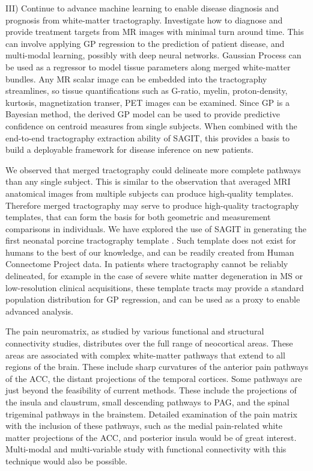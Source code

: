 III) Continue to advance machine learning to enable disease diagnosis and prognosis from white-matter tractography. Investigate how to diagnose and provide treatment targets from MR images with minimal turn around time. This can involve applying GP regression to the prediction of patient disease, and multi-modal learning, possibly with deep neural networks. Gaussian Process can be used as a regressor to model tissue parameters along merged white-matter bundles. Any MR scalar image can be embedded into the tractography streamlines, so tissue quantifications such as G-ratio, myelin, proton-density, kurtosis, magnetization transer, PET images can be examined. Since GP is a Bayesian method, the derived GP model can be used to provide predictive confidence on centroid measures from single subjects. When combined with the end-to-end tractography extraction ability of SAGIT, this provides a basis to build a deployable framework for disease inference on new patients. 


We observed that merged tractography could delineate more complete pathways than any single subject. This is similar to the observation that averaged MRI anatomical images from multiple subjects can produce high-quality templates. Therefore merged tractography may serve to produce high-quality tractography templates, that can form the basis for both geometric and measurement comparisons in individuals. We have explored the use of SAGIT in generating the first neonatal porcine tractography template \cite{Zhong2016a}. Such template does not exist for humans to the best of our knowledge, and can be readily created from Human Connectome Project data. In patients where tractography cannot be reliably delineated, for example in the case of severe white matter degeneration in MS or low-resolution clinical acquisitions, these template tracts may provide a standard population distribution for GP regression, and can be used as a proxy to enable advanced analysis.

The pain neuromatrix, as studied by various functional and structural connectivity studies, distributes over the full range of neocortical areas. These areas are associated with complex white-matter pathways that extend to all regions of the brain. These include sharp curvatures of the anterior pain pathways of the ACC, the distant projections of the temporal cortices. Some pathways are just beyond the feasibility of current methods. These include the projections of the insula and claustrum, small descending pathways to PAG, and the spinal trigeminal pathways in the brainstem. Detailed examination of the pain matrix with the inclusion of these pathways, such as the medial pain-related white matter projections of the ACC, and posterior insula would be of great interest. Multi-modal and multi-variable study with functional connectivity with this technique would also be possible. 

